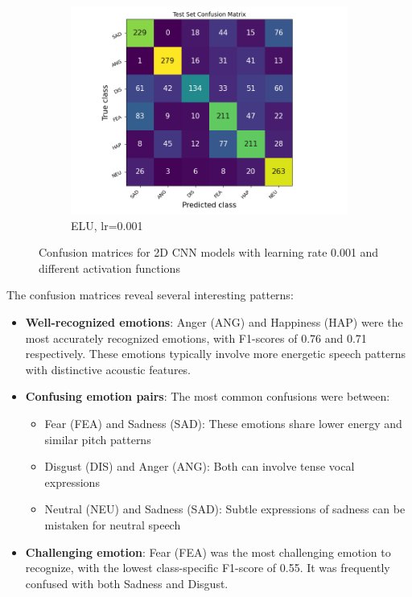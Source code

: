 \begin{figure}[h]
\begin{subfigure}[b]{0.32\textwidth}
        \includegraphics[width=\textwidth]{2D/lr0.001-ELU-2D-CF.png}
        \caption{ELU, lr=0.001}
    \end{subfigure}
    \caption{Confusion matrices for 2D CNN models with learning rate 0.001 and different activation functions}
    \label{fig:2d_confusion_matrices}
\end{figure}

The confusion matrices reveal several interesting patterns:

\begin{itemize}
    \item \textbf{Well-recognized emotions}: Anger (ANG) and Happiness (HAP) were the most accurately recognized emotions, with F1-scores of 0.76 and 0.71 respectively. These emotions typically involve more energetic speech patterns with distinctive acoustic features.
    
    \item \textbf{Confusing emotion pairs}: The most common confusions were between:
    \begin{itemize}
        \item Fear (FEA) and Sadness (SAD): These emotions share lower energy and similar pitch patterns
        \item Disgust (DIS) and Anger (ANG): Both can involve tense vocal expressions
        \item Neutral (NEU) and Sadness (SAD): Subtle expressions of sadness can be mistaken for neutral speech
    \end{itemize}
    
    \item \textbf{Challenging emotion}: Fear (FEA) was the most challenging emotion to recognize, with the lowest class-specific F1-score of 0.55. It was frequently confused with both Sadness and Disgust.
\end{itemize}

